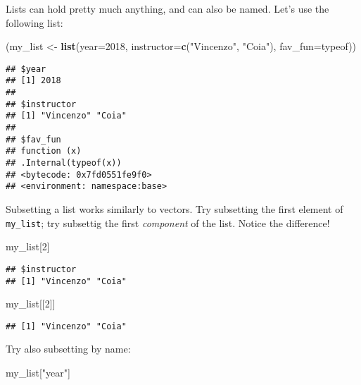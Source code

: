 \documentclass[]{article}
\newenvironment{Shaded}{\begin{snugshade}}{\end{snugshade}}
\newcommand{\KeywordTok}[1]{\textcolor[rgb]{0.13,0.29,0.53}{\textbf{#1}}}
\newcommand{\DataTypeTok}[1]{\textcolor[rgb]{0.13,0.29,0.53}{#1}}
\newcommand{\DecValTok}[1]{\textcolor[rgb]{0.00,0.00,0.81}{#1}}
\newcommand{\StringTok}[1]{\textcolor[rgb]{0.31,0.60,0.02}{#1}}
\newcommand{\NormalTok}[1]{#1}
\begin{document}
Lists can hold pretty much anything, and can also be named. Let's use
the following list:

\begin{Shaded}
\begin{Highlighting}[]
\NormalTok{(my_list <-}\StringTok{ }\KeywordTok{list}\NormalTok{(}\DataTypeTok{year=}\DecValTok{2018}\NormalTok{, }\DataTypeTok{instructor=}\KeywordTok{c}\NormalTok{(}\StringTok{"Vincenzo"}\NormalTok{, }\StringTok{"Coia"}\NormalTok{), }\DataTypeTok{fav_fun=}\NormalTok{typeof))}
\end{Highlighting}
\end{Shaded}

\begin{verbatim}
## $year
## [1] 2018
## 
## $instructor
## [1] "Vincenzo" "Coia"    
## 
## $fav_fun
## function (x) 
## .Internal(typeof(x))
## <bytecode: 0x7fd0551fe9f0>
## <environment: namespace:base>
\end{verbatim}

Subsetting a list works similarly to vectors. Try subsetting the first
element of \texttt{my\_list}; try subsettig the first \emph{component}
of the list. Notice the difference!

\begin{Shaded}
\begin{Highlighting}[]
\NormalTok{my_list[}\DecValTok{2}\NormalTok{]}
\end{Highlighting}
\end{Shaded}

\begin{verbatim}
## $instructor
## [1] "Vincenzo" "Coia"
\end{verbatim}

\begin{Shaded}
\begin{Highlighting}[]
\NormalTok{my_list[[}\DecValTok{2}\NormalTok{]]}
\end{Highlighting}
\end{Shaded}

\begin{verbatim}
## [1] "Vincenzo" "Coia"
\end{verbatim}

Try also subsetting by name:

\begin{Shaded}
\begin{Highlighting}[]
\NormalTok{my_list[}\StringTok{"year"}\NormalTok{]}
\end{Highlighting}
\end{Shaded}
\end{document}
